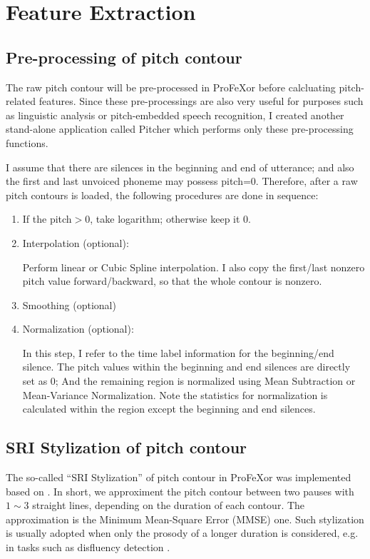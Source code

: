 \documentclass[12pt]{article}
\begin{document}
\section{Feature Extraction}

\subsection{Pre-processing of pitch contour}
\label{sec:contour}

The raw pitch contour will be pre-processed in ProFeXor before calcluating pitch-related features. Since these pre-processings are also very useful for purposes such as linguistic analysis or pitch-embedded speech recognition, I created another stand-alone application called Pitcher which performs only these pre-processing functions.

I assume that there are silences in the beginning and end of utterance; and also the first and last unvoiced phoneme may possess pitch=0. Therefore, after a raw pitch contours is loaded, the following procedures are done in sequence:

\begin{enumerate}
\item{If the pitch$>0$, take logarithm; otherwise keep it 0.}
\item{Interpolation (optional):}

Perform linear or Cubic Spline interpolation. I also copy the first/last nonzero pitch value forward/backward, so that the whole contour is nonzero.

\item{Smoothing (optional)}
\item{Normalization (optional):}

In this step, I refer to the time label information for the beginning/end silence. The pitch values within the beginning and end silences are directly set as 0; And the remaining region is normalized using Mean Subtraction or Mean-Variance Normalization. Note the statistics for normalization is calculated within the region except the beginning and end silences.
\end{enumerate}

\subsection{SRI Stylization of pitch contour}

The so-called ``SRI Stylization'' of pitch contour in ProFeXor was implemented based on \cite{sri}. In short, we approximent the pitch contour between two pauses with $1\sim3$ straight lines, depending on the duration of each contour. The approximation is the Minimum Mean-Square Error (MMSE) one. Such stylization is usually adopted when only the prosody of a longer duration is considered, e.g. in tasks such as disfluency detection \cite{disfluency}.
\end{document}
